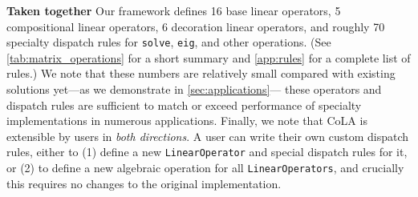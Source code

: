 \documentclass{article}
\begin{document}
\textbf{Taken together} \quad
Our framework defines 16 base linear operators,
5 compositional linear operators,
6 decoration linear operators,
and roughly 70 specialty dispatch rules for \texttt{solve}, \texttt{eig}, and other operations.
(See \autoref{tab:matrix_operations} for a short summary and \autoref{app:rules} for a complete list of rules.)
We note that these numbers are relatively small compared with existing solutions
yet---as we demonstrate in \autoref{sec:applications}---
these operators and dispatch rules are sufficient to match or exceed performance of specialty implementations in numerous applications.
Finally, we note that CoLA is extensible by users in \emph{both directions}.
A user can write their own custom dispatch rules,
either to (1) define a new \texttt{LinearOperator} and special dispatch rules for it, or (2) to define a new algebraic operation for all \texttt{LinearOperators}, and crucially this requires no changes to the original implementation.
\end{document}
